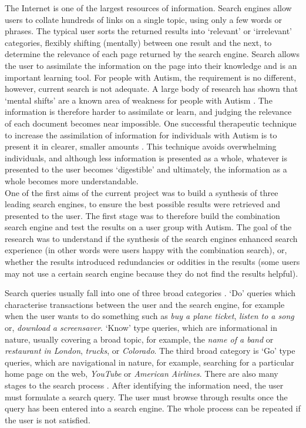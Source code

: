 \documentclass[a4paper, 11pt]{article}
\begin{document}
The Internet is one of the largest resources of information. Search engines allow users to collate hundreds of links on a single topic, using only a few words or phrases. The typical user sorts the returned results into `relevant' or `irrelevant' categories, flexibly shifting (mentally) between one result and the next, to determine the relevance of each page returned by the search engine. Search allows the user to assimilate the information on the page into their knowledge and is an important learning tool. For people with Autism, the requirement is no different, however, current search is not adequate. A large body of research has shown that `mental shifts' are a known area of weakness for people with Autism \cite{disengagement}. The information is therefore harder to assimilate or learn, and judging the relevance of each document becomes near impossible. One successful therapeutic technique to increase the assimilation of information for individuals with Autism is to present it in clearer, smaller amounts \cite{AdultsWithAutism}. This technique avoids overwhelming individuals, and although less information is presented as a whole, whatever is presented to the user becomes `digestible' and ultimately, the information as a whole becomes more understandable.  \\
\vspace{5mm}
One of the first aims of the current project was to build a synthesis of three leading search engines, to ensure the best possible results were retrieved and presented to the user. The first stage was to therefore build the combination search engine and test the results on a user group with Autism. The goal of the research was to understand if the synthesis of the search engines enhanced search experience (in other words were users happy with the combination search), or, whether the results introduced redundancies or oddities in the results (some users may not use a certain search engine because they do not find the results helpful).\\
\vspace{5mm}

Search queries usually fall into one of three broad categories \cite{seo}.  `Do' queries which characterise transactions between the user and the search engine, for example when the user wants to do something such as \textit{buy a plane ticket}, \textit{listen to a song} or, \textit{download a screensaver}. `Know' type queries, which are informational in nature, usually covering a broad topic, for example, the \textit{name of a band} or \textit{restaurant in London}, \textit{trucks}, or \textit{Colorado}. The third broad category is `Go' type queries, which are navigational in nature, for example, searching for a particular home page on the web, \textit{YouTube} or \textit{American Airlines}. There are also many stages to the search process \cite{seo}. After identifying the information need, the user must formulate a search query. The user must browse through results once the query has been entered into a search engine. The whole process can be repeated if the user is not satisfied. 
\end{document}
